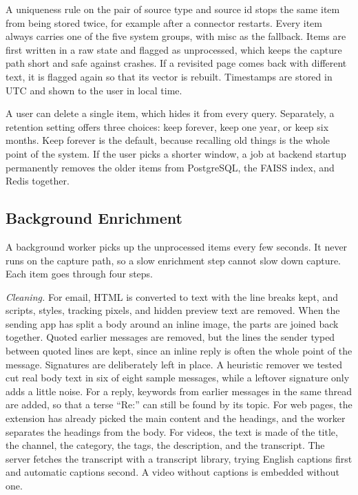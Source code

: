 \documentclass[conference]{IEEEtran}
\begin{document}
A uniqueness rule on the pair of source type and source id stops the same item from being stored twice, for example after a connector restarts. Every item always carries one of the five system groups, with misc as the fallback. Items are first written in a raw state and flagged as unprocessed, which keeps the capture path short and safe against crashes. If a revisited page comes back with different text, it is flagged again so that its vector is rebuilt. Timestamps are stored in UTC and shown to the user in local time.

A user can delete a single item, which hides it from every query. Separately, a retention setting offers three choices: keep forever, keep one year, or keep six months. Keep forever is the default, because recalling old things is the whole point of the system. If the user picks a shorter window, a job at backend startup permanently removes the older items from PostgreSQL, the FAISS index, and Redis together.

\subsection{Background Enrichment}
A background worker picks up the unprocessed items every few seconds. It never runs on the capture path, so a slow enrichment step cannot slow down capture. Each item goes through four steps.

\textit{Cleaning.} For email, HTML is converted to text with the line breaks kept, and scripts, styles, tracking pixels, and hidden preview text are removed. When the sending app has split a body around an inline image, the parts are joined back together. Quoted earlier messages are removed, but the lines the sender typed between quoted lines are kept, since an inline reply is often the whole point of the message. Signatures are deliberately left in place. A heuristic remover we tested cut real body text in six of eight sample messages, while a leftover signature only adds a little noise. For a reply, keywords from earlier messages in the same thread are added, so that a terse ``Re:'' can still be found by its topic. For web pages, the extension has already picked the main content and the headings, and the worker separates the headings from the body. For videos, the text is made of the title, the channel, the category, the tags, the description, and the transcript. The server fetches the transcript with a transcript library, trying English captions first and automatic captions second. A video without captions is embedded without one.
\end{document}
